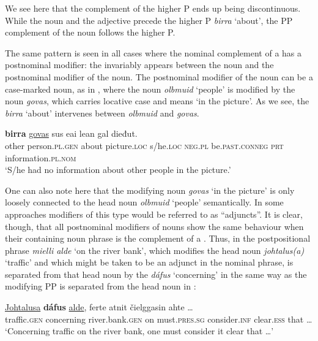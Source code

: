\documentclass[output=paper]{LSP/langsci}
\begin{document}
    \z

We see here that the complement of the higher P ends up being discontinuous. While the noun and the adjective precede the higher P \textit{birra} ‘about’, the PP complement of the noun follows the higher P.


The same pattern is seen in all cases where the nominal complement of a  has a postnominal modifier: the  invariably appears between the noun and the postnominal modifier of the noun. The postnominal modifier of the noun can be a case-marked noun, as in , where the noun \textit{olbmuid} ‘people’ is modified by the noun \textit{govas}, which carries locative case and means ‘in the picture’. As we see, the  \textit{birra} ‘about’ intervenes between \textit{olbmuid} and \textit{govas}.


\ea%
    \label{ex:julien:4}
   
    \gll   {}          \textbf{birra}    \ul{govas}        sus      eai    lean          gal  dieđut.    \\ 
	   other  {person}.\textsc{pl}.\textsc{gen}    about    picture.\textsc{loc}    s/he.\textsc {loc}    \textsc{neg.pl}      be.\textsc{past.conneg}  \textsc{prt}  information.\textsc{pl.nom}\\
    \glt  ‘S/he had no information about other people in the picture.’
    \z

One can also note here that the modifying noun \textit{govas} ‘in the picture’ is only loosely connected to the head noun \textit{olbmuid} ‘people’ semantically. In some approaches modifiers of this type would be referred to as “adjuncts”. It is clear, though, that all postnominal modifiers of nouns show the same behaviour when their containing noun phrase is the complement of a . Thus, in  the postpositional phrase \textit{mielli alde} ‘on the river bank’, which modifies the head noun \textit{johtalus(a)} ‘traffic’ and which might be taken to be an adjunct in the nominal phrase, is separated from that head noun by the  \textit{dáfus} ‘concerning’ in the same way as the modifying PP is separated from the head noun in :


\ea%
    \label{ex:julien:5}
   
    \gll  \ul{Johtalusa}  \textbf{dáfus}                \uline{alde},  ferte          atnit     čielggasin  ahte …  \\ 
	  traffic.\textsc{gen}  concerning  river.bank.\textsc{gen}  on    must.\textsc{pres.sg}    consider.\textsc{inf} clear.\textsc{ess}  that …\\
    \glt    ‘Concerning traffic on the river bank, one must consider it clear that …’
    \z
\end{document}
